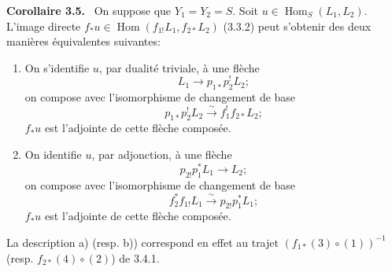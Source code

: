 \documentclass[11pt]{article}
\newenvironment{statement}[1]{\par\medskip\noindent\textbf{#1.}\ }{\par\medskip}
\DeclareMathOperator{\Hom}{Hom}
\providecommand{\Hom}{\operatorname{Hom}}
\providecommand{\Hom}{\operatorname{Hom}}
\begin{document}
\begin{statement}{Corollaire 3.5}
On suppose que $Y_1=Y_2=S$. Soit $u\in\Hom_S(L_1,L_2)$. L'image directe $f_*u\in\Hom(f_{1!}L_1,f_{2*}L_2)$ (3.3.2) peut s'obtenir des deux manières équivalentes suivantes:
\end{statement}
\begin{enumerate}[label=\alph*)]
\item On s'identifie $u$, par dualité triviale, à une flèche
\[
L_1\longrightarrow p_{1*}p_2^!L_2;
\]
on compose avec l'isomorphisme de changement de base
\[
p_{1*}p_2^!L_2\xrightarrow{\sim}f_1^!f_{2*}L_2;
\]
$f_*u$ est l'adjointe de cette flèche composée.
\item On identifie $u$, par adjonction, à une flèche
\[
p_{2!}p_1^*L_1\longrightarrow L_2;
\]
on compose avec l'isomorphisme de changement de base
\[
f_2^*f_{1!}L_1\xrightarrow{\sim}p_{2!}p_1^*L_1;
\]
$f_*u$ est l'adjointe de cette flèche composée.
\end{enumerate}
La description a) (resp. b)) correspond en effet au trajet $(f_{1*}(3)\circ(1))^{-1}$ (resp. $f_{2*}(4)\circ(2)$) de 3.4.1.
\end{document}
